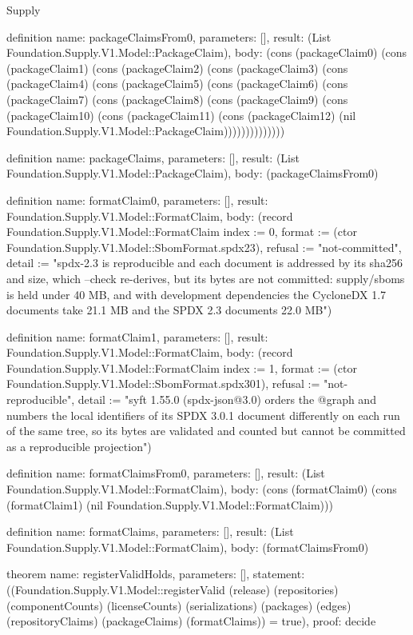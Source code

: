 \begin{lexlean}{Supply}
\begin{semanticmodule}
definition{
  name: packageClaimsFrom0,
  parameters: [],
  result: (List Foundation.Supply.V1.Model::PackageClaim),
  body: (cons (packageClaim0) (cons (packageClaim1) (cons (packageClaim2) (cons (packageClaim3) (cons (packageClaim4) (cons (packageClaim5) (cons (packageClaim6) (cons (packageClaim7) (cons (packageClaim8) (cons (packageClaim9) (cons (packageClaim10) (cons (packageClaim11) (cons (packageClaim12) (nil Foundation.Supply.V1.Model::PackageClaim))))))))))))))
}

definition{
  name: packageClaims,
  parameters: [],
  result: (List Foundation.Supply.V1.Model::PackageClaim),
  body: (packageClaimsFrom0)
}

definition{
  name: formatClaim0,
  parameters: [],
  result: Foundation.Supply.V1.Model::FormatClaim,
  body: (record Foundation.Supply.V1.Model::FormatClaim {index := 0, format := (ctor Foundation.Supply.V1.Model::SbomFormat.spdx23), refusal := "not-committed", detail := "spdx-2.3 is reproducible and each document is addressed by its sha256 and size, which --check re-derives, but its bytes are not committed: supply/sboms is held under 40 MB, and with development dependencies the CycloneDX 1.7 documents take 21.1 MB and the SPDX 2.3 documents 22.0 MB"})
}

definition{
  name: formatClaim1,
  parameters: [],
  result: Foundation.Supply.V1.Model::FormatClaim,
  body: (record Foundation.Supply.V1.Model::FormatClaim {index := 1, format := (ctor Foundation.Supply.V1.Model::SbomFormat.spdx301), refusal := "not-reproducible", detail := "syft 1.55.0 (spdx-json@3.0) orders the @graph and numbers the local identifiers of its SPDX 3.0.1 document differently on each run of the same tree, so its bytes are validated and counted but cannot be committed as a reproducible projection"})
}

definition{
  name: formatClaimsFrom0,
  parameters: [],
  result: (List Foundation.Supply.V1.Model::FormatClaim),
  body: (cons (formatClaim0) (cons (formatClaim1) (nil Foundation.Supply.V1.Model::FormatClaim)))
}

definition{
  name: formatClaims,
  parameters: [],
  result: (List Foundation.Supply.V1.Model::FormatClaim),
  body: (formatClaimsFrom0)
}

theorem{
  name: registerValidHolds,
  parameters: [],
  statement: ((Foundation.Supply.V1.Model::registerValid (release) (repositories) (componentCounts) (licenseCounts) (serializations) (packages) (edges) (repositoryClaims) (packageClaims) (formatClaims)) = true),
  proof: decide{}
}
\end{semanticmodule}
\end{lexlean}
